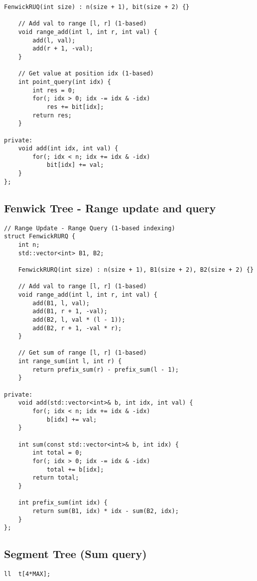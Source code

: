 \documentclass[10pt]{article}
\begin{document}
\begin{multicols*}{2}
\begin{lstlisting}[style=compactcpp]
    FenwickRUQ(int size) : n(size + 1), bit(size + 2) {}
    
    // Add val to range [l, r] (1-based)
    void range_add(int l, int r, int val) {
        add(l, val);
        add(r + 1, -val);
    }
    
    // Get value at position idx (1-based)
    int point_query(int idx) {
        int res = 0;
        for(; idx > 0; idx -= idx & -idx)
            res += bit[idx];
        return res;
    }

private:
    void add(int idx, int val) {
        for(; idx < n; idx += idx & -idx)
            bit[idx] += val;
    }
};
\end{lstlisting}

\subsection{Fenwick Tree - Range update and query}

\begin{lstlisting}[style=compactcpp]
// Range Update - Range Query (1-based indexing)
struct FenwickRURQ {
    int n;
    std::vector<int> B1, B2;
    
    FenwickRURQ(int size) : n(size + 1), B1(size + 2), B2(size + 2) {}
    
    // Add val to range [l, r] (1-based)
    void range_add(int l, int r, int val) {
        add(B1, l, val);
        add(B1, r + 1, -val);
        add(B2, l, val * (l - 1));
        add(B2, r + 1, -val * r);
    }
    
    // Get sum of range [l, r] (1-based)
    int range_sum(int l, int r) {
        return prefix_sum(r) - prefix_sum(l - 1);
    }

private:
    void add(std::vector<int>& b, int idx, int val) {
        for(; idx < n; idx += idx & -idx)
            b[idx] += val;
    }
    
    int sum(const std::vector<int>& b, int idx) {
        int total = 0;
        for(; idx > 0; idx -= idx & -idx)
            total += b[idx];
        return total;
    }
    
    int prefix_sum(int idx) {
        return sum(B1, idx) * idx - sum(B2, idx);
    }
};
\end{lstlisting}

\subsection{Segment Tree (Sum query)}

\begin{lstlisting}[style=compactcpp]
ll  t[4*MAX];
 

\end{lstlisting}
\end{multicols*}
\end{document}

